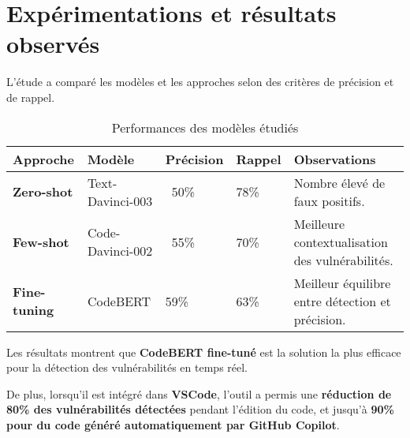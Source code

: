 \label{ExpRO}\chapter{Expérimentations et résultats observés}

L’étude a comparé les modèles et les
approches selon des critères de précision et de rappel.

\begin{table}
        \centering
        \begin{tabular}{lllll}
            \toprule
            \textbf{Approche} & \textbf{Modèle} & \textbf{Précision} & \textbf{Rappel} & \textbf{Observations} \\
            \midrule
        \textbf{Zero-shot} & Text-Davinci-003 & ~50\% & 78\% & Nombre élevé de faux positifs. \\
        \textbf{Few-shot} & Code-Davinci-002 & ~55\% & 70\% & Meilleure contextualisation des vulnérabilités. \\
        \textbf{Fine-tuning} & CodeBERT & 59\% & 63\% & Meilleur équilibre entre détection et précision. \\
            \bottomrule
        \end{tabular}
        \caption{Performances des modèles étudiés}
        \label{tab:}
\end{table}


Les résultats montrent que \textbf{CodeBERT
fine-tuné} est la solution la plus efficace pour la détection des
vulnérabilités en temps réel.



De plus, lorsqu’il est intégré dans \textbf{VSCode},
l’outil a permis une \textbf{réduction de 80\% des vulnérabilités détectées}
pendant l’édition du code, et jusqu’à \textbf{90\% pour du code généré
automatiquement par GitHub Copilot}.





